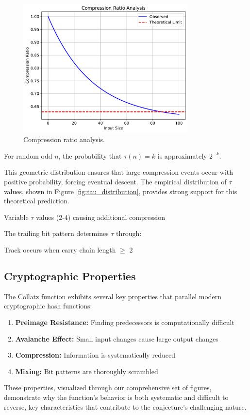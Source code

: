 \begin{figure}[h]
\centering
\includegraphics[width=0.8\textwidth]{figures/compression_ratio.pdf}
\caption{Compression ratio analysis.}
\label{fig:compression_ratio}
\end{figure}

\begin{theorem}\label{thm:compression}
For random odd $n$, the probability that $\tau(n) = k$ is approximately $2^{-k}$.
\end{theorem}

This geometric distribution ensures that large compression events occur with positive probability, forcing eventual descent. The empirical distribution of $\tau$ values, shown in Figure \ref{fig:tau_distribution}, provides strong support for this theoretical prediction.

Variable $\tau$ values (2-4) causing additional compression

The trailing bit pattern determines $\tau$ through:

Track occurs when carry chain length $\geq$ 2

\subsection{Cryptographic Properties}

The Collatz function exhibits several key properties that parallel modern cryptographic hash functions:

\begin{enumerate}
\item \textbf{Preimage Resistance:} Finding predecessors is computationally difficult
\item \textbf{Avalanche Effect:} Small input changes cause large output changes
\item \textbf{Compression:} Information is systematically reduced
\item \textbf{Mixing:} Bit patterns are thoroughly scrambled
\end{enumerate}

These properties, visualized through our comprehensive set of figures, demonstrate why the function's behavior is both systematic and difficult to reverse, key characteristics that contribute to the conjecture's challenging nature. 